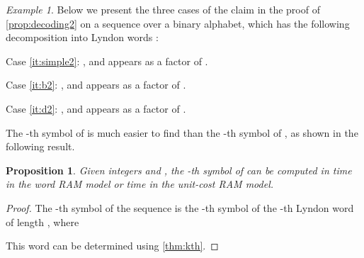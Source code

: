 \documentclass{article}
\newtheorem{proposition}[theorem]{Proposition}
\theoremstyle{definition}
\theoremstyle{remark}
\newtheorem{example}[theorem]{Example}
\begin{document}
\begin{example}
  Below we present the three cases of the claim in the proof of \cref{prop:decoding2}
  on a sequence  over a binary alphabet, which has the following
  decomposition into Lyndon words :

  \medskip
  \begin{center}
  \end{center}
  \begin{description}
    \item{Case \ref{it:simple2}:}
      , and  appears as a factor of .
    \item{Case \ref{it:b2}:}
      , and  appears as a factor of .
    \item{Case \ref{it:d2}:}
      , and  appears as a factor of .
  \end{description}
\end{example}

The -th symbol of  is much easier to find than the -th symbol of ,
as shown in the following result.
\begin{proposition}\label{prop:random-access2}
  Given integers  and , the -th symbol of  can be computed
  in  time in the word RAM model or  time in the unit-cost RAM model.
\end{proposition}
\begin{proof}
  The -th symbol of the sequence  is the
  -th symbol of the -th Lyndon word of length , where
  
  This word can be determined using \cref{thm:kth}.
\end{proof}
\end{document}
